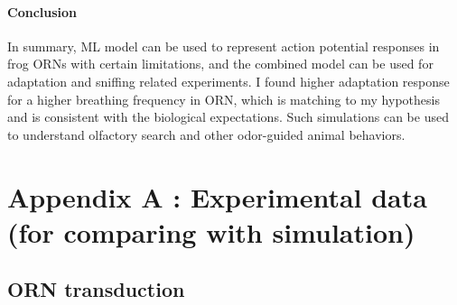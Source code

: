 \documentclass[
]{article}
\begin{document}
\hypertarget{conclusion}{%
\paragraph*{Conclusion}\label{conclusion}}

In summary, ML model can be used to represent action potential responses in frog ORNs with certain limitations, and the combined model can be used for adaptation and sniffing related experiments. I found higher adaptation response for a higher breathing frequency in ORN, which is matching to my hypothesis and is consistent with the biological expectations. Such simulations can be used to understand olfactory search and other odor-guided animal behaviors.

\clearpage

\hypertarget{appendix-appendix}{%
\appendix}


\hypertarget{appendix-a-experimental-data-for-comparing-with-simulation}{%
\section*{Appendix A : Experimental data (for comparing with simulation)}\label{appendix-a-experimental-data-for-comparing-with-simulation}}

\hypertarget{orn-transduction}{%
\subsection*{ORN transduction}\label{orn-transduction}}
\end{document}
